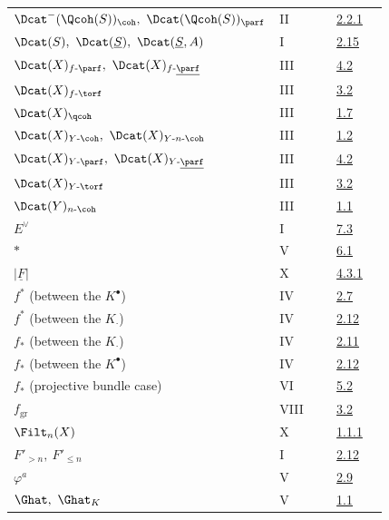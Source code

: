 \begin{longtable}{@{}>{\raggedright\arraybackslash}p{0.50\linewidth}>{\raggedright\arraybackslash}p{0.17\linewidth}>{\raggedright\arraybackslash}p{0.15\linewidth}@{}}
\(\Dcat^{-}(\Qcoh(S))_{\coh},\ \Dcat(\Qcoh(S))_{\parf}\) & II & \hyperlink{sga6.e02.notation.2-2-1}{2.2.1}\\
\(\Dcat(S),\ \Dcat(\underline S),\ \Dcat(\underline S,A)\) & I & \hyperlink{sga6.e01.ex.2-15}{2.15}\\
\(\Dcat(X)_{f\text{-}\parf},\ \Dcat(X)_{f\text{-}\underline{\parf}}\) & III & \hyperlink{sga6.e03.notation.4-2}{4.2}\\
\(\Dcat(X)_{f\text{-}\torf}\) & III & \hyperlink{sga6.e03.notation.3-2}{3.2}\\
\(\Dcat(X)_{\qcoh}\) & III & \hyperlink{sga6.e03.lem.1-7}{1.7}\\
\(\Dcat(X)_{Y\text{-}\coh},\ \Dcat(X)_{Y\text{-}n\text{-}\coh}\) & III & \hyperlink{sga6.e03.def.1-2}{1.2}\\
\(\Dcat(X)_{Y\text{-}\parf},\ \Dcat(X)_{Y\text{-}\underline{\parf}}\) & III & \hyperlink{sga6.e03.notation.4-2}{4.2}\\
\(\Dcat(X)_{Y\text{-}\torf}\) & III & \hyperlink{sga6.e03.notation.3-2}{3.2}\\
\(\Dcat(Y)_{n\text{-}\coh}\) & III & \hyperlink{sga6.e03.thm.1-1}{1.1}\\
\(E^\vee\) & I & \hyperlink{sga6.e01.def.7-3}{7.3}\\
\(*\) & V & \hyperlink{sga6.e05.para.6-1}{6.1}\\
\(\lvert\underline F\rvert\) & X & \hyperlink{sga6.e10.prop.4-3-1}{4.3.1}\\
\(f^*\) (between the \(K^{\bullet}\)) & IV & \hyperlink{sga6.e04.para.2-7}{2.7}\\
\(f^*\) (between the \(K_{\cdot}\)) & IV & \hyperlink{sga6.e04.para.2-12}{2.12}\\
\(f_*\) (between the \(K_{\cdot}\)) & IV & \hyperlink{sga6.e04.para.2-11}{2.11}\\
\(f_*\) (between the \(K^{\bullet}\)) & IV & \hyperlink{sga6.e04.para.2-12}{2.12}\\
\(f_*\) (projective bundle case) & VI & \hyperlink{sga6.e06.sec.5.2}{5.2}\\
\(f_{\operatorname{gr}}\) & VIII & \hyperlink{sga6.e08.prop.3-2}{3.2}\\
\(\Filt_n(X)\) & X & \hyperlink{sga6.e10.def.1-1-1}{1.1.1}\\
\(F'_{>n},\ F'_{\leq n}\) & I & \hyperlink{sga6.e01.prop.2-12}{2.12}\\
\(\varphi^a\) & V & \hyperlink{sga6.e05.para.2-9}{2.9}\\
\(\Ghat,\ \Ghat_K\) & V & \hyperlink{sga6.e05.para.1-1}{1.1}\\

\end{longtable}
